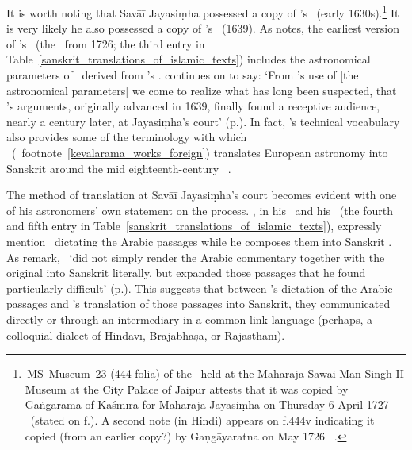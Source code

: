 It is worth noting that Savāī Jayasiṃha possessed a copy of \Nityananda's \Siddhantasindhu\ (\circa early 1630s).\footnote{\,MS~Museum~23 (444 folia) of the \Siddhantasindhu\ held at the Maharaja Sawai Man Singh II Museum at the City Palace of Jaipur attests that it was copied by Gaṅgārāma of Kaśmīra for Mahārāja Jayasiṃha on Thursday 6 April 1727 \ce\ (stated on f.). A second note (in Hindi) appears on f.\thinspace 444v indicating it copied (from an earlier copy?) by Gaṇgāyaratna on  May 1726 \ce\ \parencite[142--143]{PingreeJaipur}.\label{ss_museum_23_description}} It is very likely he also possessed a copy of \Nityananda's \Sarvasiddhantaraja\ (1639). As \textcite[79]{PingreeAstronomersprogress} notes, the earliest version of \Jagannathafull's \Samratsiddhanta\ (\ie the \Samratsiddhantakaustubha\ from 1726; the third entry in Table~\ref{sanskrit_translations_of_islamic_texts}) includes the astronomical parameters of \UlughBeg\ derived from \Nityananda's \Sarvasiddhantaraja. \citeauthor{PingreeAstronomersprogress} continues on to say: `From \Jagannatha's use of [the astronomical parameters] we come to realize what has long been suspected, that \Nityananda's arguments, originally advanced in 1639, finally found a receptive audience, nearly a century later, at Jayasiṃha's court' (p.). In fact, \Nityananda's technical vocabulary also provides some of the terminology with which \Kevalarama\ (\vid\ footnote~\ref{kevalarama_works_foreign}) translates European astronomy into Sanskrit around the mid eighteenth-century \ce\ \parencite[283]{PingreeSSR}.

The method of translation at Savāī Jayasiṃha's court becomes evident with one of his astronomers' own statement on the process. \Nayanasukhopadhyaya, in his \Ukara\ and his \Sarahatajakiravirajandi\ (the fourth and fifth entry in Table~\ref{sanskrit_translations_of_islamic_texts}), expressly mention \MuhammadAbidda\ dictating the Arabic passages while he composes them into Sanskrit \parencite[73-74]{SarmaJaiSinghSanskrit}. As \textcite{KusubaPingree} remark, \Nayanasukhopadhyaya\ `did not simply render the Arabic commentary together with the original into Sanskrit literally, but expanded those passages that he found particularly difficult' (p.). This suggests that between \MuhammadAbidda's  dictation of the Arabic passages and \Nayanasukhopadhyaya's translation of those passages into Sanskrit, they communicated directly or through an intermediary in a common link  language (perhaps, a colloquial dialect of Hindavī, Brajabhāṣā, or Rājasthānī). 

